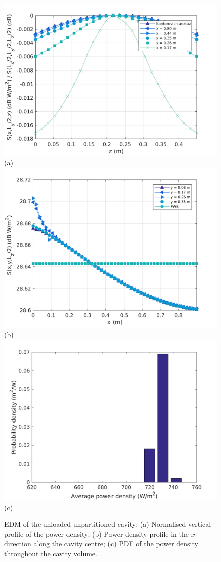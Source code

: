 \documentclass[a4paper]{article}
\numberwithin{equation}{section}
\begin{document}
\begin{figure}[hp]
\begin{center}
\includegraphics[width=0.6\linewidth]{figures/SDM_3D_SU_PowerDensityProfileZ}\\
{\footnotesize (a)}\\
\vspace{2mm}
\includegraphics[width=0.6\linewidth]{figures/SDM_3D_SU_PowerDensityProfileX}\\
{\footnotesize (b)}\\
\vspace{2mm}
\includegraphics[width=0.6\linewidth]{figures/SDM_3D_SU_PowerDensityPDF}\\
{\footnotesize (c)}\\
\vspace{-2mm}
\caption{\label{fg:unpartempty_profs} EDM of the unloaded unpartitioned cavity: (a) Normalised vertical profile of the power density; 
(b) Power density profile in the $x$-direction along the cavity centre; (c) PDF of the power density throughout the cavity volume.}
\end{center}
\end{figure}
\end{document}
